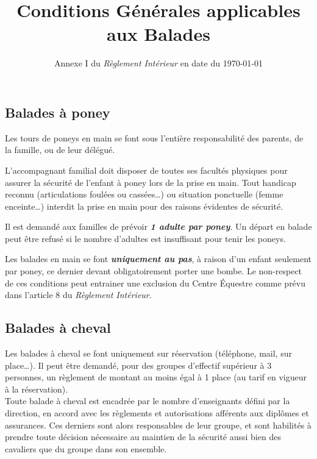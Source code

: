 \documentclass[11pt,a4paper]{article}
\title[Conditions Générales applicables aux Balades \\ version du \today]{Conditions Générales applicables aux Balades}
\subtitle{Annexe I du \textit{Règlement Intérieur} en date du \today}
\author{}
\date{}
\renewcommand{\emph}[1]{\textit{\textbf{#1}}}
\begin{document}
   \maketitle

   \vspace{-30pt}

   \subsection*{Balades à poney}
      Les tours de poneys en main se font sous l'entière responsabilité des parents, de la famille, ou de leur délégué.

      L'accompagnant familial doit disposer de toutes ses facultés physiques pour assurer la sécurité de l'enfant à poney lors de la prise en main.
      Tout handicap reconnu (articulations foulées ou cassées\dots) ou situation ponctuelle (femme enceinte\dots) interdit la prise en main pour des raisons évidentes de sécurité.

      Il est demandé aux familles de prévoir \emph{1 adulte par poney}.
      Un départ en balade peut être refusé si le nombre d'adultes est insuffisant pour tenir les poneys.

      Les balades en main se font \emph{uniquement au pas}, à raison d'un enfant seulement par poney, ce dernier devant obligatoirement porter une bombe.
      Le non-respect de ces conditions peut entrainer une exclusion du Centre Équestre comme prévu dans l'article 8 du \textit{Règlement Intérieur}.

   \subsection*{Balades à cheval}
      Les balades à cheval se font uniquement sur réservation (téléphone, mail, sur place\dots).
      Il peut être demandé, pour des groupes d'effectif supérieur à 3 personnes, un règlement de montant au moins égal à 1 place (au tarif en vigueur à la réservation).
      \\

      Toute balade à cheval est encadrée par le nombre d'enseignants défini par la direction, en accord avec les règlements et autorisations afférents aux diplômes et assurances.
      Ces derniers sont alors responsables de leur groupe, et sont habilités à prendre toute décision nécessaire au maintien de la sécurité aussi bien des cavaliers que du groupe dans son ensemble.
      \\
\end{document}
